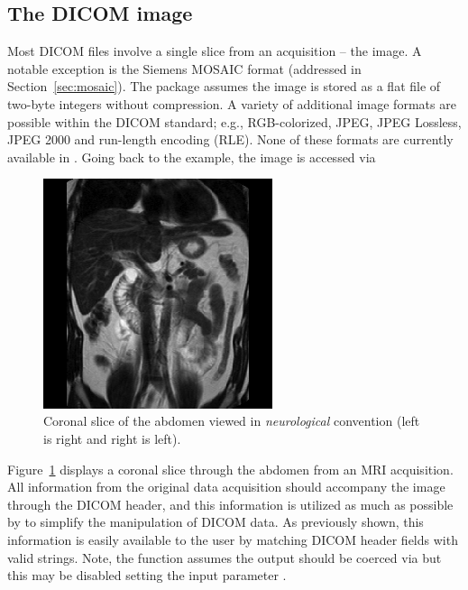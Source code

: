 \documentclass[article,nojss,shortnames]{jss}
\begin{document}
\subsection{The DICOM image}

Most DICOM files involve a single slice from an acquisition -- the
image.  A notable exception is the Siemens MOSAIC format (addressed in
Section~\ref{sec:mosaic}).  The  package assumes the
image is stored as a flat file of two-byte integers without
compression.  A variety of additional image formats are possible
within the DICOM standard; e.g., RGB-colorized, JPEG, JPEG Lossless,
JPEG 2000 and run-length encoding (RLE).  None of these formats are
currently available in .  Going back to the
 example, the image is accessed via

\begin{Schunk}
\end{Schunk}

\begin{figure}[tbp]
  \centering
  \includegraphics*[width=0.6\textwidth]{dicom_abdo.jpeg}
  \caption{Coronal slice of the abdomen viewed in
    \textit{neurological} convention (left is right and right is
    left).}
  \label{fig:dicom_abdo}
\end{figure}

Figure~\ref{fig:dicom_abdo} displays a coronal slice through the
abdomen from an MRI acquisition.  All information from the original
data acquisition should accompany the image through the DICOM header,
and this information is utilized as much as possible by
 to simplify the manipulation of DICOM data.  As
previously shown, this information is easily available to the user by
matching DICOM header fields with valid strings.  Note, the function
 assumes the output should be coerced via
 but this may be disabled setting the input parameter
.
\end{document}
